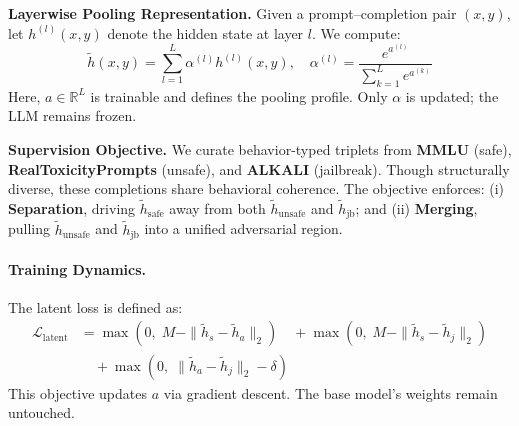 \textbf{Layerwise Pooling Representation.} 
Given a prompt--completion pair \((x, y)\), let \(h^{(l)}(x, y)\) denote the hidden state at layer \(l\). We compute:
\[
\tilde{h}(x, y) = \sum_{l=1}^{L} \alpha^{(l)} h^{(l)}(x, y), \quad 
\alpha^{(l)} = \frac{e^{a^{(l)}}}{\sum_{k=1}^{L} e^{a^{(k)}}}
\]
Here, \(a \in \mathbb{R}^L\) is trainable and defines the pooling profile. Only \(\alpha\) is updated; the LLM remains frozen.

\textbf{Supervision Objective.} 
We curate behavior-typed triplets from \textbf{MMLU} (safe), \textbf{RealToxicityPrompts} (unsafe), and \textbf{ALKALI} (jailbreak). Though structurally diverse, these completions share behavioral coherence. The objective enforces: (i) \textbf{Separation}, driving \(\tilde{h}_{\text{safe}}\) away from both \(\tilde{h}_{\text{unsafe}}\) and \(\tilde{h}_{\text{jb}}\); and (ii) \textbf{Merging}, pulling \(\tilde{h}_{\text{unsafe}}\) and \(\tilde{h}_{\text{jb}}\) into a unified adversarial region.


\paragraph{Training Dynamics.} 
The latent loss is defined as:
{\scriptsize
\begin{align*}
\mathcal{L}_{\text{latent}} &= 
\max(0,\; M - \|\tilde{h}_s - \tilde{h}_a\|_2) \quad + \max(0,\; M - \|\tilde{h}_s - \tilde{h}_j\|_2) \\
&\quad + \max(0,\; \|\tilde{h}_a - \tilde{h}_j\|_2 - \delta)
\end{align*}
}
This objective updates \(a\) via gradient descent. The base model’s weights remain untouched.

